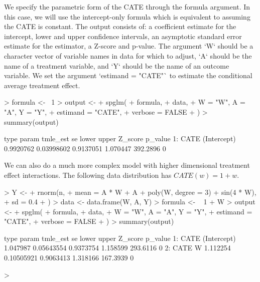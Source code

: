\documentclass{article}
\begin{document}
We specify the parametric form of the CATE through the formula argument. In this case, we will use the intercept-only formula which is equivalent to assuming the CATE is constant.  The output consists of:
a coefficient estimate for the intercept, lower and upper confidence intervals, an asymptotic standard error estimate for the estimator, a Z-score and p-value. The argument `W` should be a character vector of variable names in data for which to adjust, `A` should be the name of a treatment variable, and `Y` should be the name of an outcome variable. We set the argument `estimand = "CATE"` to estimate the conditional average treatment effect.
\begin{Schunk}
\begin{Sinput}
> formula <- ~1
> output <-
+   spglm(
+     formula,
+     data,
+     W = "W", A = "A", Y = "Y",
+     estimand = "CATE",
+     verbose = FALSE
+   )
> summary(output)
\end{Sinput}
\begin{Soutput}
   type       param  tmle_est         se     lower    upper  Z_score p_value
1: CATE (Intercept) 0.9920762 0.03998602 0.9137051 1.070447 392.2896       0
\end{Soutput}
\end{Schunk}
We can also do a much more complex model with higher dimensional treatment effect interactions. The following data distribution has $CATE(w) = 1 + w$.  
\begin{Schunk}
\begin{Sinput}
> Y <-
+   rnorm(n,
+     mean = A * W + A + poly(W, degree = 3) + sin(4 * W),
+     sd = 0.4
+   )
> data <- data.frame(W, A, Y)
> formula <- ~ 1 + W
> output <-
+   spglm(
+     formula,
+     data,
+     W = "W", A = "A", Y = "Y",
+     estimand = "CATE",
+     verbose = FALSE
+   )
> summary(output)
\end{Sinput}
\begin{Soutput}
   type       param tmle_est         se     lower    upper  Z_score p_value
1: CATE (Intercept) 1.047987 0.05643554 0.9373754 1.158599 293.6116       0
2: CATE           W 1.112254 0.10505921 0.9063413 1.318166 167.3939       0
\end{Soutput}
\begin{Sinput}
> 
\end{Sinput}
\end{Schunk}
\end{document}
